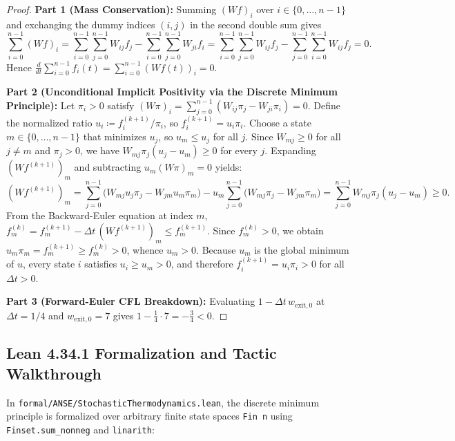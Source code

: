 \documentclass[11pt,a4paper]{article}
\theoremstyle{definition}
\theoremstyle{remark}
\begin{document}
\begin{proof}
\textbf{Part 1 (Mass Conservation):} Summing $(Wf)_i$ over $i \in \{0, \dots, n-1\}$ and exchanging the dummy indices $(i,j)$ in the second double sum gives
\[
  \sum_{i=0}^{n-1} (Wf)_i = \sum_{i=0}^{n-1}\sum_{j=0}^{n-1} W_{ij}f_j - \sum_{i=0}^{n-1}\sum_{j=0}^{n-1} W_{ji}f_i = \sum_{i=0}^{n-1}\sum_{j=0}^{n-1} W_{ij}f_j - \sum_{j=0}^{n-1}\sum_{i=0}^{n-1} W_{ij}f_j = 0.
\]
Hence $\frac{d}{dt}\sum_{i=0}^{n-1} f_i(t) = \sum_{i=0}^{n-1} (Wf(t))_i = 0$.

\textbf{Part 2 (Unconditional Implicit Positivity via the Discrete Minimum Principle):} Let $\pi_i > 0$ satisfy $(W\pi)_i = \sum_{j=0}^{n-1} (W_{ij}\pi_j - W_{ji}\pi_i) = 0$. Define the normalized ratio $u_i \coloneqq f_i^{(k+1)}/\pi_i$, so $f_i^{(k+1)} = u_i \pi_i$. Choose a state $m \in \{0, \dots, n-1\}$ that minimizes $u_j$, so $u_m \le u_j$ for all $j$. Since $W_{mj} \ge 0$ for all $j \neq m$ and $\pi_j > 0$, we have $W_{mj}\pi_j(u_j - u_m) \ge 0$ for every $j$. Expanding $(Wf^{(k+1)})_m$ and subtracting $u_m (W\pi)_m = 0$ yields:
\[
  (Wf^{(k+1)})_m = \sum_{j=0}^{n-1} \bigl(W_{mj} u_j \pi_j - W_{jm} u_m \pi_m\bigr) - u_m \sum_{j=0}^{n-1} \bigl(W_{mj}\pi_j - W_{jm}\pi_m\bigr) = \sum_{j=0}^{n-1} W_{mj}\pi_j (u_j - u_m) \ge 0.
\]
From the Backward-Euler equation at index $m$, $f_m^{(k)} = f_m^{(k+1)} - \Delta t\,(Wf^{(k+1)})_m \le f_m^{(k+1)}$. Since $f_m^{(k)} > 0$, we obtain $u_m \pi_m = f_m^{(k+1)} \ge f_m^{(k)} > 0$, whence $u_m > 0$. Because $u_m$ is the global minimum of $u$, every state $i$ satisfies $u_i \ge u_m > 0$, and therefore $f_i^{(k+1)} = u_i \pi_i > 0$ for all $\Delta t > 0$.

\textbf{Part 3 (Forward-Euler CFL Breakdown):} Evaluating $1 - \Delta t\,w_{\mathrm{exit},0}$ at $\Delta t = 1/4$ and $w_{\mathrm{exit},0} = 7$ gives $1 - \frac{1}{4}\cdot 7 = -\frac{3}{4} < 0$.
\end{proof}

\subsection{Lean 4.34.1 Formalization and Tactic Walkthrough}
In \texttt{formal/ANSE/StochasticThermodynamics.lean}, the discrete minimum principle is formalized over arbitrary finite state spaces \texttt{Fin n} using \texttt{Finset.sum\_nonneg} and \texttt{linarith}:
\end{document}
